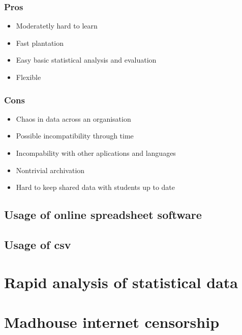 \subsubsection{Pros}
\begin{itemize}
\item Moderatetly hard to learn
\item Fast plantation
\item Easy basic statistical analysis and evaluation
\item Flexible
\end{itemize}

\subsubsection{Cons}
\begin{itemize}
\item Chaos in data across an organisation
\item Possible incompatibility through time
\item Incompability with other aplications and languages
\item Nontrivial archivation
\item Hard to keep shared data with students up to date
\end{itemize}

\subsection{Usage of online spreadsheet software}
\subsection{Usage of csv}


\section{Rapid analysis of statistical data}

\section{Madhouse internet censorship}
